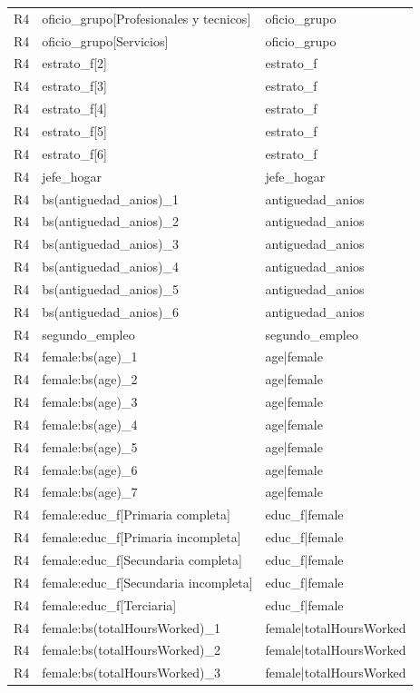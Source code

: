 \begin{longtable}{lll}
R4 & oficio\_grupo[Profesionales y tecnicos] & oficio\_grupo \\
R4 & oficio\_grupo[Servicios] & oficio\_grupo \\
R4 & estrato\_f[2] & estrato\_f \\
R4 & estrato\_f[3] & estrato\_f \\
R4 & estrato\_f[4] & estrato\_f \\
R4 & estrato\_f[5] & estrato\_f \\
R4 & estrato\_f[6] & estrato\_f \\
R4 & jefe\_hogar & jefe\_hogar \\
R4 & bs(antiguedad\_anios)\_1 & antiguedad\_anios \\
R4 & bs(antiguedad\_anios)\_2 & antiguedad\_anios \\
R4 & bs(antiguedad\_anios)\_3 & antiguedad\_anios \\
R4 & bs(antiguedad\_anios)\_4 & antiguedad\_anios \\
R4 & bs(antiguedad\_anios)\_5 & antiguedad\_anios \\
R4 & bs(antiguedad\_anios)\_6 & antiguedad\_anios \\
R4 & segundo\_empleo & segundo\_empleo \\
R4 & female:bs(age)\_1 & age|female \\
R4 & female:bs(age)\_2 & age|female \\
R4 & female:bs(age)\_3 & age|female \\
R4 & female:bs(age)\_4 & age|female \\
R4 & female:bs(age)\_5 & age|female \\
R4 & female:bs(age)\_6 & age|female \\
R4 & female:bs(age)\_7 & age|female \\
R4 & female:educ\_f[Primaria completa] & educ\_f|female \\
R4 & female:educ\_f[Primaria incompleta] & educ\_f|female \\
R4 & female:educ\_f[Secundaria completa] & educ\_f|female \\
R4 & female:educ\_f[Secundaria incompleta] & educ\_f|female \\
R4 & female:educ\_f[Terciaria] & educ\_f|female \\
R4 & female:bs(totalHoursWorked)\_1 & female|totalHoursWorked \\
R4 & female:bs(totalHoursWorked)\_2 & female|totalHoursWorked \\
R4 & female:bs(totalHoursWorked)\_3 & female|totalHoursWorked \\

\end{longtable}
